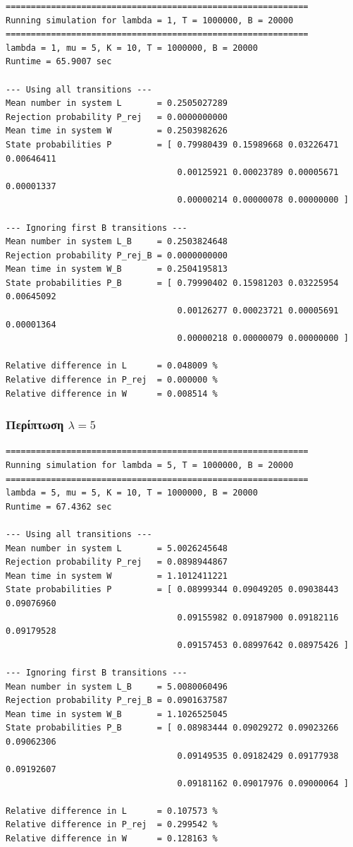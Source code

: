 \documentclass{article}
\begin{document}
{
\begin{verbatim}
============================================================
Running simulation for lambda = 1, T = 1000000, B = 20000
============================================================
lambda = 1, mu = 5, K = 10, T = 1000000, B = 20000
Runtime = 65.9007 sec

--- Using all transitions ---
Mean number in system L       = 0.2505027289
Rejection probability P_rej   = 0.0000000000
Mean time in system W         = 0.2503982626
State probabilities P         = [ 0.79980439 0.15989668 0.03226471 0.00646411
                                  0.00125921 0.00023789 0.00005671 0.00001337
                                  0.00000214 0.00000078 0.00000000 ]

--- Ignoring first B transitions ---
Mean number in system L_B     = 0.2503824648
Rejection probability P_rej_B = 0.0000000000
Mean time in system W_B       = 0.2504195813
State probabilities P_B       = [ 0.79990402 0.15981203 0.03225954 0.00645092
                                  0.00126277 0.00023721 0.00005691 0.00001364
                                  0.00000218 0.00000079 0.00000000 ]

Relative difference in L      = 0.048009 %
Relative difference in P_rej  = 0.000000 %
Relative difference in W      = 0.008514 %
\end{verbatim}
}

\subsubsection*{Περίπτωση $\lambda = 5$}

{
\begin{verbatim}
============================================================
Running simulation for lambda = 5, T = 1000000, B = 20000
============================================================
lambda = 5, mu = 5, K = 10, T = 1000000, B = 20000
Runtime = 67.4362 sec

--- Using all transitions ---
Mean number in system L       = 5.0026245648
Rejection probability P_rej   = 0.0898944867
Mean time in system W         = 1.1012411221
State probabilities P         = [ 0.08999344 0.09049205 0.09038443 0.09076960
                                  0.09155982 0.09187900 0.09182116 0.09179528
                                  0.09157453 0.08997642 0.08975426 ]

--- Ignoring first B transitions ---
Mean number in system L_B     = 5.0080060496
Rejection probability P_rej_B = 0.0901637587
Mean time in system W_B       = 1.1026525045
State probabilities P_B       = [ 0.08983444 0.09029272 0.09023266 0.09062306
                                  0.09149535 0.09182429 0.09177938 0.09192607
                                  0.09181162 0.09017976 0.09000064 ]

Relative difference in L      = 0.107573 %
Relative difference in P_rej  = 0.299542 %
Relative difference in W      = 0.128163 %
\end{verbatim}
}
\end{document}
